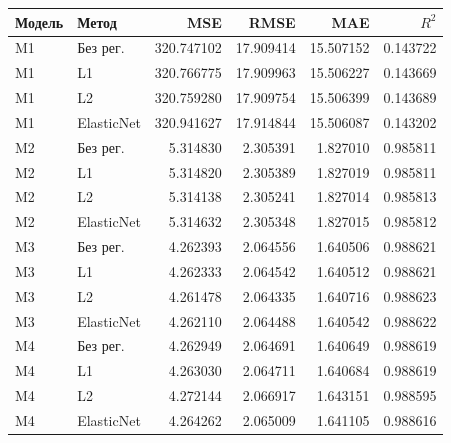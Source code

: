 \begin{tabular}{llrrrr}
\toprule
Модель & Метод & MSE & RMSE & MAE & $R^2$ \\
\midrule
M1 & Без рег. & 320.747102 & 17.909414 & 15.507152 & 0.143722 \\
M1 & L1 & 320.766775 & 17.909963 & 15.506227 & 0.143669 \\
M1 & L2 & 320.759280 & 17.909754 & 15.506399 & 0.143689 \\
M1 & ElasticNet & 320.941627 & 17.914844 & 15.506087 & 0.143202 \\
M2 & Без рег. & 5.314830 & 2.305391 & 1.827010 & 0.985811 \\
M2 & L1 & 5.314820 & 2.305389 & 1.827019 & 0.985811 \\
M2 & L2 & 5.314138 & 2.305241 & 1.827014 & 0.985813 \\
M2 & ElasticNet & 5.314632 & 2.305348 & 1.827015 & 0.985812 \\
M3 & Без рег. & 4.262393 & 2.064556 & 1.640506 & 0.988621 \\
M3 & L1 & 4.262333 & 2.064542 & 1.640512 & 0.988621 \\
M3 & L2 & 4.261478 & 2.064335 & 1.640716 & 0.988623 \\
M3 & ElasticNet & 4.262110 & 2.064488 & 1.640542 & 0.988622 \\
M4 & Без рег. & 4.262949 & 2.064691 & 1.640649 & 0.988619 \\
M4 & L1 & 4.263030 & 2.064711 & 1.640684 & 0.988619 \\
M4 & L2 & 4.272144 & 2.066917 & 1.643151 & 0.988595 \\
M4 & ElasticNet & 4.264262 & 2.065009 & 1.641105 & 0.988616 \\
\bottomrule
\end{tabular}
